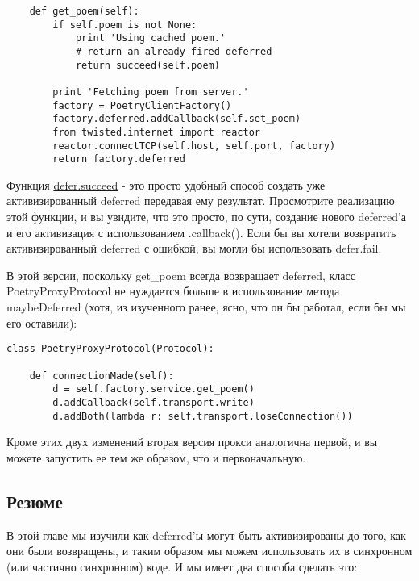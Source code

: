  \begin{verbatim}
    def get_poem(self):
        if self.poem is not None:
            print 'Using cached poem.'
            # return an already-fired deferred
            return succeed(self.poem)

        print 'Fetching poem from server.'
        factory = PoetryClientFactory()
        factory.deferred.addCallback(self.set_poem)
        from twisted.internet import reactor
        reactor.connectTCP(self.host, self.port, factory)
        return factory.deferred
\end{verbatim} 


Функция \href{http://twistedmatrix.com/trac/browser/tags/releases/twisted-8.2.0/twisted/internet/defer.py#L30}{defer.succeed} - это просто удобный способ создать уже 
активизированный deferred передавая ему результат. 
Просмотрите реализацию этой функции, и вы увидите, что 
это просто, по сути, создание нового deferred'а и его 
активизация с использованием .callback(). Если бы вы хотели 
возвратить активизированный deferred с ошибкой, вы могли бы 
использовать defer.fail.


В этой версии, поскольку get\_poem всегда возвращает 
deferred, класс PoetryProxyProtocol не нуждается больше 
в использование метода maybeDeferred (хотя, из изученного ранее, 
ясно, что он бы работал, если бы мы его оставили): 

 \begin{verbatim}
class PoetryProxyProtocol(Protocol):

    def connectionMade(self):
        d = self.factory.service.get_poem()
        d.addCallback(self.transport.write)
        d.addBoth(lambda r: self.transport.loseConnection())

\end{verbatim} 


Кроме этих двух изменений вторая версия прокси аналогична первой, 
и вы можете запустить ее тем же образом, что и первоначальную.


\subsection{Резюме}


В этой главе мы изучили как deferred'ы могут быть активизированы 
до того, как они были возвращены, и таким образом мы можем 
использовать их в синхронном (или частично синхронном) коде. 
И мы имеет два способа сделать это: 

